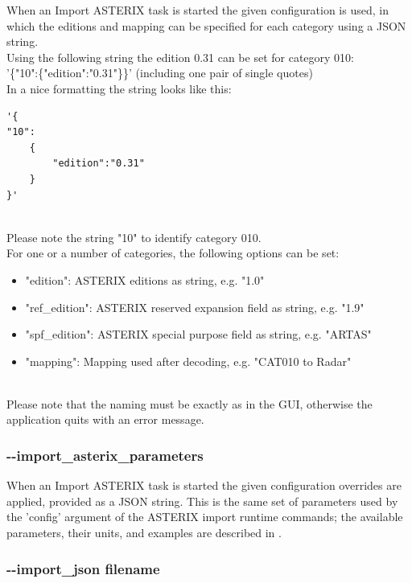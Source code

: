 When an Import ASTERIX task is started the given configuration is used, in which the editions and mapping can be specified for each category using a JSON string. \\

Using the following string the edition 0.31 can be set for category 010:  \\
'\{"10":\{"edition":"0.31"\}\}' (including one pair of single quotes) \\

In a nice formatting the string looks like this:
\begin{lstlisting}[basicstyle=\small\ttfamily]
'{
"10":
    {
        "edition":"0.31"
    }
}'
\end{lstlisting}
\ \\

Please note the string "10" to identify category 010. \\

For one or a number of categories, the following options can be set:

\begin{itemize}
\item "edition":  ASTERIX editions as string, e.g. "1.0"
\item "ref\_edition":  ASTERIX reserved expansion field as string, e.g. "1.9"
\item "spf\_edition": ASTERIX special purpose field as string, e.g. "ARTAS"
\item "mapping": Mapping used after decoding, e.g. "CAT010 to Radar"
\end{itemize}
\ \\

Please note that the naming must be exactly as in the GUI, otherwise the application quits with an error message.

\subsubsection{-{}-import\_asterix\_parameters}
\label{sec:cli_import_asterix_parameters}

When an Import ASTERIX task is started the given configuration overrides are applied, provided as a JSON string. This is the same set of parameters used by the 'config' argument of the ASTERIX import runtime commands; the available parameters, their units, and examples are described in .


\subsubsection{-{}-import\_json filename}

